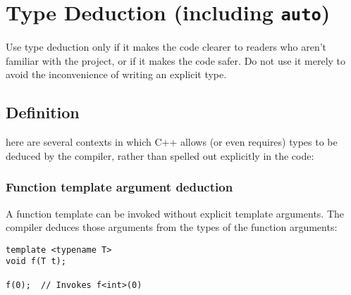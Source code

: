 
\section{Type Deduction (including \texorpdfstring{\texttt{auto}}{\texttwoinferior})}\label{sec:type-deduction-(including-auto)}
Use type deduction only if it makes the code clearer to readers who aren't familiar with the project, or if it makes the code safer. Do not use it merely to avoid the inconvenience of writing an explicit type.

\subsection{Definition}
here are several contexts in which C++ allows (or even requires) types to be deduced by the compiler, rather than spelled out explicitly in the code:

\subsubsection{Function template argument deduction}
A function template can be invoked without explicit template arguments. The compiler deduces those arguments from the types of the function arguments:
\begin{verbatim}
template <typename T>
void f(T t);

f(0);  // Invokes f<int>(0)
\end{verbatim}

